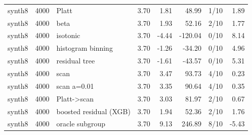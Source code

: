 \begin{tabular}{lllrrrlr}
synth8 & 4000 & Platt & 3.70 & 1.81 & 48.99 & 1/10 & 1.89 \\
synth8 & 4000 & beta & 3.70 & 1.93 & 52.16 & 2/10 & 1.77 \\
synth8 & 4000 & isotonic & 3.70 & -4.44 & -120.04 & 0/10 & 8.14 \\
synth8 & 4000 & histogram binning & 3.70 & -1.26 & -34.20 & 0/10 & 4.96 \\
synth8 & 4000 & residual tree & 3.70 & -1.61 & -43.57 & 0/10 & 5.31 \\
synth8 & 4000 & scan & 3.70 & 3.47 & 93.73 & 4/10 & 0.23 \\
synth8 & 4000 & scan a=0.01 & 3.70 & 3.35 & 90.64 & 4/10 & 0.35 \\
synth8 & 4000 & Platt->scan & 3.70 & 3.03 & 81.97 & 2/10 & 0.67 \\
synth8 & 4000 & boosted residual (XGB) & 3.70 & 1.94 & 52.36 & 2/10 & 1.76 \\
synth8 & 4000 & oracle subgroup & 3.70 & 9.13 & 246.89 & 8/10 & -5.43 \\
\bottomrule
\end{tabular}
